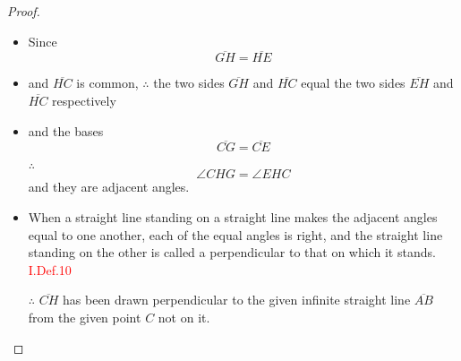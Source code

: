 \begin{proof}

\begin{itemize}

\item[]

\item Since 
\[\overline{GH} = \overline{HE}\]

\item and $\overline{HC}$ is common, $\therefore$ the two sides $\overline{GH}$ and $\overline{HC}$ equal the two sides $\overline{EH}$ and $\overline{HC}$ respectively

\clearpage

\item and the bases 
\[\overline{CG} = \overline{CE}\] 

\item[$\therefore$] 
\[\angle{CHG} = \angle{EHC}\] 
and they are adjacent angles.

\item When a straight line standing on a straight line makes the adjacent angles equal to one another, each of the equal angles is right, and the straight line standing on the other is called a perpendicular to that on which it stands.\hfill\textcolor{red}{ I.Def.10}

\item[$\therefore$] $\overline{CH}$ has been drawn perpendicular to the given infinite straight line $\overline{AB}$ from the given point $C$ not on it.

\end{itemize}

\end{proof}

\clearpage
